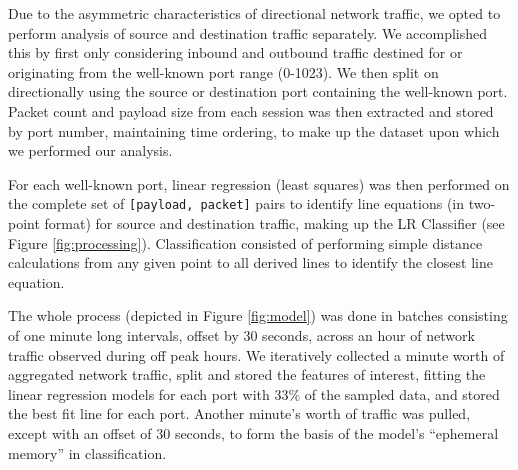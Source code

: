 Due to the asymmetric characteristics of directional network traffic, we opted to perform analysis of source and destination traffic separately. We accomplished this by first only considering inbound and outbound traffic destined for or originating from the well-known port range (0-1023). We then split on directionally using the source or destination port containing the well-known port. Packet count and payload size from each session was then extracted and stored by port number, maintaining time ordering, to make up the dataset upon which we performed our analysis.

For each well-known port, linear regression (least squares) was then performed on the complete set of \texttt{[payload, packet]} pairs to identify line equations (in two-point format) for source and destination traffic, making up the LR Classifier (see Figure \ref{fig:processing}). Classification consisted of performing simple distance calculations from any given point to all derived lines to identify the closest line equation.

The whole process (depicted in Figure \ref{fig:model}) was done in batches consisting of one minute long intervals, offset by 30 seconds, across an hour of network traffic observed during off peak hours. We iteratively collected a minute worth of aggregated network traffic, split and stored the features of interest, fitting the linear regression models for each port with 33\% of the sampled data, and stored the best fit line for each port.  Another minute's worth of traffic was pulled, except with an offset of 30 seconds, to form the basis of the model's ``ephemeral memory'' in classification.